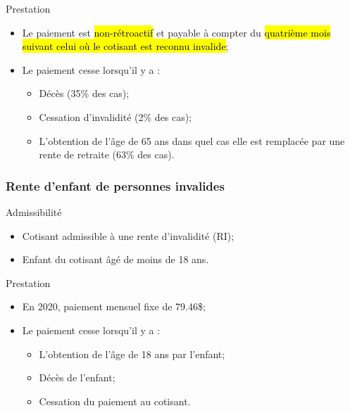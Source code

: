 \documentclass[10pt, french]{article}
\begin{document}
\begin{multicols*}{3}
\begin{conceptgen}{Prestation}
\begin{itemize}[leftmargin = *]
	\item	Le paiement est \hl{non-rétroactif} et payable à compter du \hl{quatrième mois suivant celui où le cotisant est reconnu invalide};
	\item	Le paiement cesse lorsqu'il y a :
		\begin{itemize}[leftmargin = *]
		\item	Décès (35\% des cas);
		\item	Cessation d'invalidité (2\% des cas);
		\item	L'obtention de l'âge de 65 ans dans quel cas elle est remplacée par une rente de retraite (63\% des cas).
		\end{itemize}
\end{itemize}
\end{conceptgen}

\subsubsection*{Rente d'enfant de personnes invalides}

\begin{conceptgen}{Admissibilité}
\begin{itemize}[leftmargin = *]
	\item	Cotisant admissible à une rente d'invalidité (RI);
	\item	Enfant du cotisant âgé de moins de 18 ans.
\end{itemize}
\end{conceptgen}

\begin{conceptgen}{Prestation}
\begin{itemize}[leftmargin = *]
	\item	En 2020, paiement mensuel fixe de 79.46\$;
	\item	Le paiement cesse lorsqu'il y a :
		\begin{itemize}[leftmargin = *]
		\item	L'obtention de l'âge de 18 ans par l'enfant;
		\item	Décès de l'enfant;
		\item	Cessation du paiement au cotisant.
		\end{itemize}
\end{itemize}
\end{conceptgen}

\columnbreak


\end{multicols*}
\end{document}
